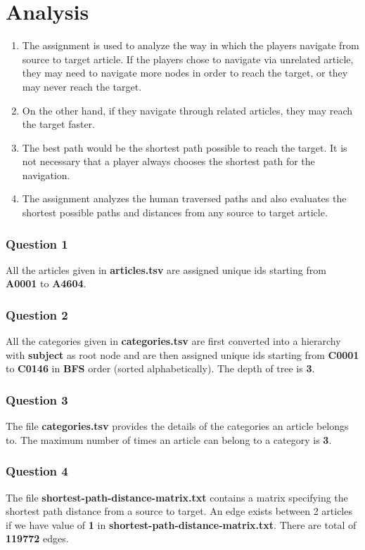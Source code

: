 \documentclass[12pt,a4paper]{report}
\begin{document}
\chapter{Analysis}
\begin{flushleft}

\begin{enumerate}
    \item The assignment is used to analyze the way in which the players navigate from source to target article. If the players chose to navigate via unrelated article, they may need to navigate more nodes in order to reach the target, or they may never reach the target.
    \item On the other hand, if they navigate through related articles, they may reach the target faster. 
    \item The best path would be the shortest path possible to reach the target. It is not necessary that a player always chooses the shortest path for the navigation. 
    \item The assignment analyzes the human traversed paths and also evaluates the shortest possible paths and distances from any source to target article.
\end{enumerate}
    
\subsection*{Question 1}
All the articles given in \textbf{articles.tsv} are assigned unique ids starting from \textbf{A0001} to \textbf{A4604}.

\subsection*{Question 2}
All the categories given in \textbf{categories.tsv} are first converted
into a hierarchy with \textbf{subject} as root node and are then assigned unique ids
starting from \textbf{C0001} to \textbf{C0146} in \textbf{BFS} order (sorted alphabetically). The depth of tree is \textbf{3}.

\subsection*{Question 3}
The file \textbf{categories.tsv} provides the details of the categories an
article belongs to. The maximum number of times an article can belong to a category is \textbf{3}.

\subsection*{Question 4}
The file \textbf{shortest-path-distance-matrix.txt} contains a matrix specifying
the shortest path distance from a source to target. An edge exists between 2 articles if we have value of \textbf{1} in \textbf{shortest-path-distance-matrix.txt}. There are total of \textbf{119772} edges.


\end{flushleft}
\end{document}
